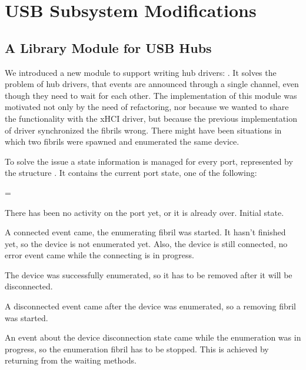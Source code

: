 \chapter{USB Subsystem Modifications}
\label{usb-refactoring}





\section{A Library Module for USB Hubs}
\label{hub-port-refactoring}

We introduced a new module to support writing hub drivers:
. It solves the problem of
hub drivers, that events are announced through a single channel, even though
they need to wait for each other. The implementation of this module was
motivated not only by the need of refactoring, nor because we wanted to share
the functionality with the xHCI driver, but because the previous implementation
of  driver synchronized the fibrils wrong. There might have been
situations in which two fibrils were spawned and enumerated the same device.

To solve the issue a state information is managed for every port, represented
by the structure . It contains the current port state, one
of the following:

\begin{description}
\begingroup \leftskip=1cm \rightskip=\leftskip
\setcounter{enumi}{-1}
	\item[\state{Disabled}]
		There has been no activity on the port yet, or it is already over.
		Initial state.

	\item[\state{Connecting}]
		A connected event came, the enumerating fibril was started. It hasn't
		finished yet, so the device is not enumerated yet. Also, the device is
		still connected, no error event came while the connecting is in
		progress.

	\item[\state{Enumerated}]
		The device was successfully enumerated, so it has to be removed after
		it will be disconnected.

	\item[\state{Disconnecting}]
		A disconnected event came after the device was enumerated, so
		a removing fibril was started.

	\item[\state{Error}]
		An event about the device disconnection state came while the
		enumeration was in progress, so the enumeration fibril has to be
		stopped. This is achieved by returning  from the waiting
		methods.

\endgroup
\end{description}

